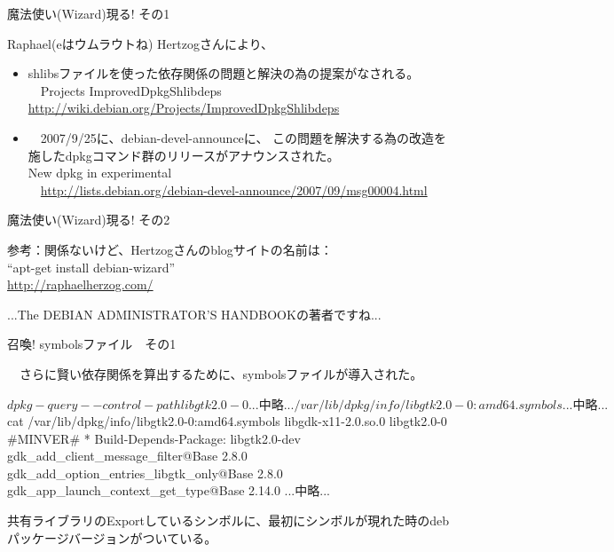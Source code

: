 \begin{frame}{魔法使い(Wizard)現る! その1}

 Raphael(eはウムラウトね) Hertzogさんにより、
\begin{itemize}
\item shlibsファイルを使った依存関係の問題と解決の為の提案がなされる。\\
　Projects ImprovedDpkgShlibdeps\\
\url{http://wiki.debian.org/Projects/ImprovedDpkgShlibdeps}
\item　2007/9/25に、debian-devel-announceに、
この問題を解決する為の改造を施したdpkgコマンド群のリリースがアナウンスされた。\\
  New dpkg in experimental\\
　\url{http://lists.debian.org/debian-devel-announce/2007/09/msg00004.html}
\end{itemize}

\end{frame}

\begin{frame}{魔法使い(Wizard)現る! その2}

 参考：関係ないけど、Hertzogさんのblogサイトの名前は：\\
``apt-get install debian-wizard''\\
\url{http://raphaelherzog.com/}

 ...The DEBIAN ADMINISTRATOR'S HANDBOOKの著者ですね...

\end{frame}

\begin{frame}[containsverbatim]{召喚! symbolsファイル　その1}

　さらに賢い依存関係を算出するために、symbolsファイルが導入された。

\begin{commandline}
$ dpkg-query --control-path libgtk2.0-0
...中略...
/var/lib/dpkg/info/libgtk2.0-0:amd64.symbols
...中略...
$ cat /var/lib/dpkg/info/libgtk2.0-0:amd64.symbols
libgdk-x11-2.0.so.0 libgtk2.0-0 #MINVER#
* Build-Depends-Package: libgtk2.0-dev
 gdk_add_client_message_filter@Base 2.8.0
 gdk_add_option_entries_libgtk_only@Base 2.8.0
 gdk_app_launch_context_get_type@Base 2.14.0
...中略...
\end{commandline}

 共有ライブラリのExportしているシンボルに、最初にシンボルが現れた時のdebパッケージバージョンがついている。

\end{frame}

